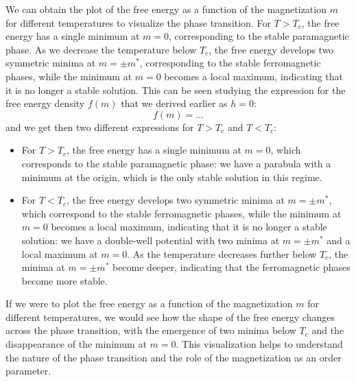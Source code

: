 We can obtain the plot of the free energy as a function of the magnetization \(m\) for different temperatures to visualize the phase transition. For \(T > T_c\), the free energy has a single minimum at \(m = 0\), corresponding to the stable paramagnetic phase. As we decrease the temperature below \(T_c\), the free energy develops two symmetric minima at \(m = \pm m^*\), corresponding to the stable ferromagnetic phases, while the minimum at \(m = 0\) becomes a local maximum, indicating that it is no longer a stable solution. This can be seen studying the expression for the free energy density \(f(m)\) that we derived earlier as \(h=0\):
\[
    f(m) = \dots
\]
and we get then two different expressions for \(T > T_c\) and \(T < T_c\):
\begin{itemize}
    \item For \(T > T_c\), the free energy has a single minimum at \(m = 0\), which corresponds to the stable paramagnetic phase: we have a parabula with a minimum at the origin, which is the only stable solution in this regime.
    \item For \(T < T_c\), the free energy develops two symmetric minima at \(m = \pm m^*\), which correspond to the stable ferromagnetic phases, while the minimum at \(m = 0\) becomes a local maximum, indicating that it is no longer a stable solution: we have a double-well potential with two minima at \(m = \pm m^*\) and a local maximum at \(m = 0\). As the temperature decreases further below \(T_c\), the minima at \(m = \pm m^*\) become deeper, indicating that the ferromagnetic phases become more stable.
\end{itemize}
If we were to plot the free energy as a function of the magnetization \(m\) for different temperatures, we would see how the shape of the free energy changes across the phase transition, with the emergence of two minima below \(T_c\) and the disappearance of the minimum at \(m = 0\). This visualization helps to understand the nature of the phase transition and the role of the magnetization as an order parameter.

